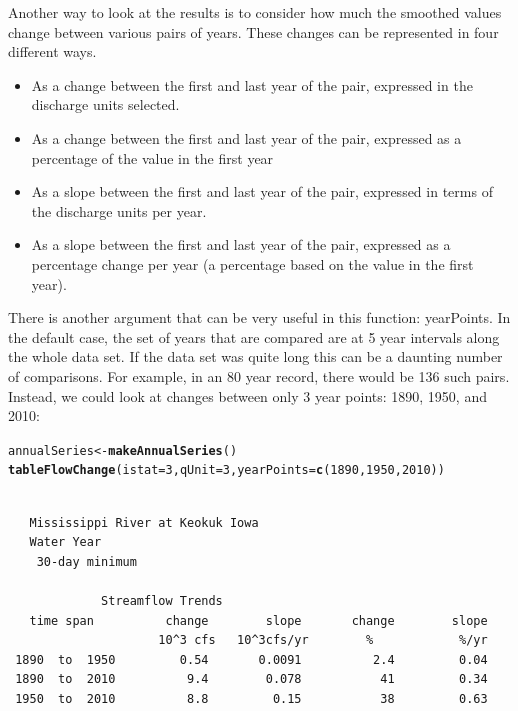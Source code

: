 \documentclass[a4paper,11pt]{article}\usepackage[]{graphicx}\usepackage[]{color}
\makeatletter
\newcommand{\hlnum}[1]{\textcolor[rgb]{0.686,0.059,0.569}{#1}}%
\newcommand{\hlstd}[1]{\textcolor[rgb]{0.345,0.345,0.345}{#1}}%
\newcommand{\hlkwb}[1]{\textcolor[rgb]{0.69,0.353,0.396}{#1}}%
\newcommand{\hlkwc}[1]{\textcolor[rgb]{0.333,0.667,0.333}{#1}}%
\newcommand{\hlkwd}[1]{\textcolor[rgb]{0.737,0.353,0.396}{\textbf{#1}}}%
\newenvironment{kframe}{%
 \def\at@end@of@kframe{}%
 \ifinner\ifhmode%
  \def\at@end@of@kframe{\end{minipage}}%
  \begin{minipage}{\columnwidth}%
 \fi\fi%
 \def\FrameCommand##1{\hskip\@totalleftmargin \hskip-\fboxsep
 \colorbox{shadecolor}{##1}\hskip-\fboxsep
     \hskip-\linewidth \hskip-\@totalleftmargin \hskip\columnwidth}%
 \MakeFramed {\advance\hsize-\width
   \@totalleftmargin\z@ \linewidth\hsize
   \@setminipage}}%
 {\par\unskip\endMakeFramed%
 \at@end@of@kframe}
\newenvironment{knitrout}{}{} %
\makeatother
\begin{document}
Another way to look at the results is to consider how much the smoothed values change between various pairs of years.  These changes can be represented in four different ways.  
\begin{itemize}
  \item As a change between the first and last year of the pair, expressed in the discharge units selected.
  \item As a change between the first and last year of the pair, expressed as a percentage of the value in the first year
  \item As a slope between the first and last year of the pair, expressed in terms of the discharge units per year.
  \item As a slope between the first and last year of the pair, expressed as a percentage change per year (a percentage based on the value in the first year).
\end{itemize}

There is another argument that can be very useful in this function: yearPoints.  In the default case, the set of years that are compared are at 5 year intervals along the whole data set.  If the data set was quite long this can be a daunting number of comparisons.  For example, in an 80 year record, there would be 136 such pairs. Instead, we could look at changes between only 3 year points: 1890, 1950, and 2010: 


\begin{knitrout}
\color{fgcolor}\begin{kframe}
\begin{alltt}
\hlstd{annualSeries} \hlkwb{<-} \hlkwd{makeAnnualSeries}\hlstd{()}
\hlkwd{tableFlowChange}\hlstd{(}\hlkwc{istat}\hlstd{=}\hlnum{3}\hlstd{,} \hlkwc{qUnit}\hlstd{=}\hlnum{3}\hlstd{,}\hlkwc{yearPoints}\hlstd{=}\hlkwd{c}\hlstd{(}\hlnum{1890}\hlstd{,}\hlnum{1950}\hlstd{,}\hlnum{2010}\hlstd{))}
\end{alltt}
\begin{verbatim}

   Mississippi River at Keokuk Iowa
   Water Year
    30-day minimum 

             Streamflow Trends
   time span          change        slope       change        slope
                     10^3 cfs   10^3cfs/yr        %            %/yr
 1890  to  1950         0.54       0.0091          2.4         0.04
 1890  to  2010          9.4        0.078           41         0.34
 1950  to  2010          8.8         0.15           38         0.63
\end{verbatim}
\end{kframe}
\end{knitrout}
\end{document}
